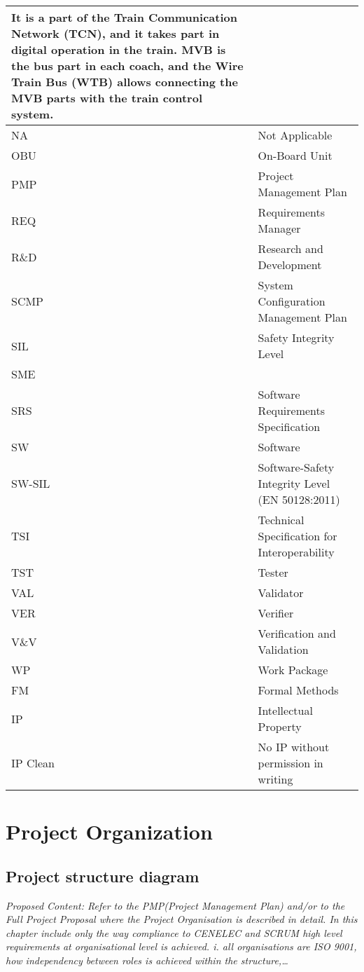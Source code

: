 \documentclass{template/openetcs_article}
\begin{document}
\begin{supertabular}{|m{3cm}m{11cm}|}
It is a part of the Train Communication Network (TCN), and it takes part in digital operation in the train. MVB is the bus part in each coach, and the Wire Train Bus (WTB) allows connecting the MVB parts with the train control system.\\\hline
NA &
Not Applicable\\\hline
OBU &
On-Board Unit\\\hline
PMP &
Project Management Plan\\\hline
REQ &
Requirements Manager\\\hline
R\&D &
Research and Development\\\hline
SCMP &
System Configuration Management Plan\\\hline
SIL &
Safety Integrity Level\\\hline
SME &
~
\\\hline
SRS &
Software Requirements Specification\\\hline
SW &
Software\\\hline
SW-SIL &
Software-Safety Integrity Level (EN 50128:2011)\\\hline
TSI &
Technical Specification for Interoperability\\\hline
TST &
Tester\\\hline
VAL &
Validator\\\hline
VER &
Verifier\\\hline
V\&V &
Verification and Validation\\\hline
WP &
Work Package\\\hline
FM &
Formal Methods\\\hline
IP &
Intellectual Property\\\hline
IP Clean &
No IP without permission in writing \\\hline
\end{supertabular}

\section{Project Organization}

\subsection{Project structure diagram}
\textit{Proposed Content: Refer to the PMP(Project Management Plan) and/or to the Full Project Proposal where the Project Organisation is described in detail. 
In this chapter include only the way compliance to CENELEC and SCRUM high level requirements at organisational level is achieved. i. all organisations are ISO 9001, how independency between roles is achieved within the structure,{\dots}}
\end{document}
